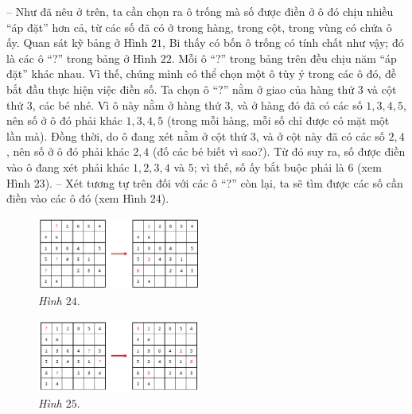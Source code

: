 	-- Như đã nêu ở trên, ta cần chọn ra ô trống mà số được điền ở ô đó chịu nhiều “áp đặt” hơn cả, từ các số đã có ở trong hàng, trong cột, trong vùng có chứa ô ấy. Quan sát kỹ bảng ở Hình $21$, Bi thấy có bốn ô trống có tính chất như vậy; đó là các ô “?” trong bảng ở Hình $22$.
	\vskip 0.1cm
	Mỗi ô “?” trong bảng trên đều chịu năm “áp đặt” khác nhau. Vì thế, chúng mình có thể chọn một ô tùy ý trong các ô đó, đề bắt đầu thực hiện việc điền số. Ta chọn ô “?” nằm ở giao của hàng thứ $3$ và cột thứ $3$, các bé nhé. Vì ô này nằm ở hàng thứ $3$, và ở hàng đó đã có các số $1, 3, 4, 5$, nên số ở ô đó phải khác $1, 3, 4, 5$ (trong mỗi hàng, mỗi số chỉ được có mặt một lần mà). Đồng thời, do ô đang xét nằm ở cột thứ $3$, và ở cột này đã có các số $2, 4$, nên số ở ô đó phải khác $2, 4$ (đố các bé biết vì sao?). Từ đó suy ra, số được điền vào ô đang xét phải khác $1, 2, 3, 4$ và $5$; vì thế, số ấy bắt buộc phải là $6$ (xem Hình $23$).
	\vskip 0.1cm
	-- Xét tương tự trên đối với các ô “?” còn lại, ta sẽ tìm được các số cần điền vào các ô đó (xem Hình $24$).
	\begin{multicols}{2}
		\begin{figure}[H]
			\centering
			\vspace*{-5pt}
			\captionsetup{labelformat= empty, justification=centering}
			\includegraphics[width=0.48\textwidth]{pic13}
			\caption{\small\textit{Hình $24.$}}
			\vspace*{-10pt}
		\end{figure}
		\begin{figure}[H]
			\centering
			\vspace*{-5pt}
			\captionsetup{labelformat= empty, justification=centering}
			\includegraphics[width=0.48\textwidth]{pic14}
			\caption{\small\textit{Hình $25.$}}
			\vspace*{-10pt}
		\end{figure}
	\end{multicols}
